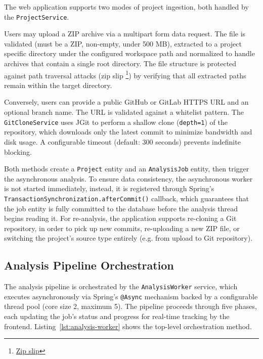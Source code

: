 \par The web application supports two modes of project ingestion, both handled by the \texttt{ProjectService}.

\par Users may upload a ZIP archive via a multipart form data request. The file is validated (must be a ZIP, non-empty, under 500 MB), extracted to a project specific directory under the configured workspace path and normalized to handle archives that contain a single root directory. The file structure is protected against path traversal attacks (zip slip \footnote{\href{https://maven.apache.org/security-plexus-archiver.html}{Zip slip}}) by verifying that all extracted paths remain within the target directory.

\par Conversely, users can provide a public GitHub or GitLab HTTPS URL and an optional branch name. The URL is validated against a whitelist pattern. The \texttt{Git\-Clone\-Ser\-vice} uses JGit to perform a shallow clone (\texttt{depth=1}) of the repository, which downloads only the latest commit to minimize bandwidth and disk usage. A configurable timeout (default: 300 seconds) prevents indefinite blocking.

Both methods create a \texttt{Project} entity and an \texttt{AnalysisJob} entity, then trigger the asynchronous analysis. To ensure data consistency, the asynchronous worker is not started immediately, instead, it is registered through Spring's \texttt{Tran\-sac\-tionSyn\-chron\-i\-zation.afterCommit()} callback, which guarantees that the job entity is fully committed to the database before the analysis thread begins reading it. For re-analysis, the application supports re-cloning a Git repository, in order to pick up new commits, re-uploading a new ZIP file, or switching the project's source type entirely (e.g. from upload to Git repository).

\subsection{Analysis Pipeline Orchestration}
\label{subsec: analysis-pipeline}

\par The analysis pipeline is orchestrated by the \texttt{AnalysisWorker} service, which executes asynchronously via Spring's \texttt{@Async} mechanism backed by a configurable thread pool (core size 2, maximum 5). The pipeline proceeds through five phases, each updating the job's status and progress for real-time tracking by the frontend. Listing~\ref{lst:analysis-worker} shows the top-level orchestration method.

